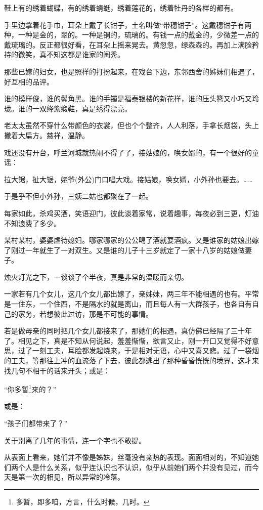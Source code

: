 \par 鞋上有的绣着蝴蝶，有的绣着蜻蜓，绣着莲花的，绣着牡丹的各样的都有。
\par 手里边拿着花手巾，耳朵上戴了长钳子，土名叫做“带穗钳子”。这戴穗钳子有两种，一种是金的，翠的。一种是铜的，琉璃的。有钱一点的戴金的，少微差一点的戴琉璃的。反正都很好看，在耳朵上摇来晃去。黄忽忽，绿森森的。再加上满脸矜持的微笑，真不知这都是谁家的闺秀。
\par 那些已嫁的妇女，也是照样的打扮起来，在戏台下边，东邻西舍的姊妹们相遇了，好互相的品评。
\par 谁的模样俊，谁的鬓角黑。谁的手镯是福泰银楼的新花样，谁的压头簪又小巧又玲珑。谁的一双绛紫缎鞋，真是绣得漂亮。
\par 老太太虽然不穿什么带颜色的衣裳，但也个个整齐，人人利落，手拿长烟袋，头上撇着大扁方。慈祥，温静。
\par 戏还没有开台，呼兰河城就热闹不得了了，接姑娘的，唤女婿的，有一个很好的童谣：
\par 拉大锯，扯大锯，姥爷(外公)门口唱大戏。接姑娘，唤女婿，小外孙也要去。……
\par 于是乎不但小外孙，三姨二姑也都聚在了一起。
\par 每家如此，杀鸡买酒，笑语迎门，彼此谈着家常，说着趣事，每夜必到三更，灯油不知浪费了多少。
\par 某村某村，婆婆虐待媳妇。哪家哪家的公公喝了酒就耍酒疯。又是谁家的姑娘出嫁了刚过一年就生了一对双生。又是谁的儿子十三岁就定了一家十八岁的姑娘做妻子。
\par 烛火灯光之下，一谈谈了个半夜，真是非常的温暖而亲切。
\par 一家若有几个女儿，这几个女儿都出嫁了，亲姊妹，两三年不能相遇的也有。平常是一住东，一个住西，不是隔水的就是离山，而且每人有一大群孩子，也各自有自己的家务，若想彼此过访，那是不可能的事情。
\par 若是做母亲的同时把几个女儿都接来了，那她们的相遇，真仿佛已经隔了三十年了。相见之下，真是不知从何说起，羞羞惭惭，欲言又止，刚一开口又觉得不好意思，过了一刻工夫，耳脸都发起烧来，于是相对无语，心中又喜又悲。过了一袋烟的工夫，等那往上冲的血流落了下去，彼此都逃出了那种昏昏恍恍的境界，这才来找几句不相干的话来开头；或是：
\par “你多暂\footnote{多暂，即多咱，方言，什么时候，几时。}来的？”
\par 或是：
\par “孩子们都带来了？”
\par 关于别离了几年的事情，连一个字也不敢提。
\par 从表面上看来，她们并不像是姊妹，丝毫没有亲热的表现。面面相对的，不知道她们两个人是什么关系，似乎连认识也不认识，似乎从前她们两个并没有见过，而今天是第一次的相见，所以异常的冷落。
